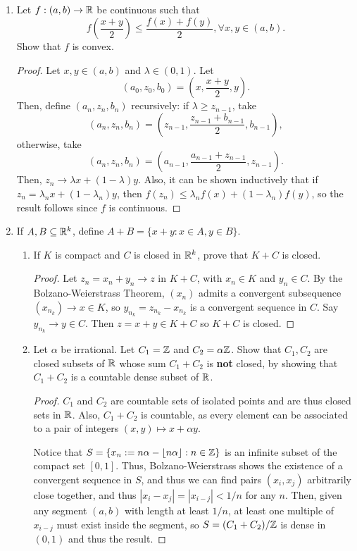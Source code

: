 \begin{enumerate}
\item %
Let $f: (a, b) \rightarrow \mathbb{R}$ be continuous such that
\[
    f\left(\frac{x+y}{2}\right) \le \frac{f(x) + f(y)}{2}, \forall x, y \in (a, b).
\]
Show that $f$ is convex.

\begin{proof}
    Let $x, y \in (a, b)$ and $\lambda \in (0, 1)$. Let
    \[
        (a_0, z_0, b_0) = (x, \frac{x+y}{2}, y).
    \]
    Then, define $(a_n, z_n, b_n)$ recursively: if $\lambda \ge z_{n-1}$, take 
    \[
        (a_n, z_n, b_n) = \left(z_{n-1}, \frac{z_{n-1} + b_{n-1}}{2}, b_{n-1}\right),
    \]
    otherwise, take 
    \[
        (a_n, z_n, b_n) = \left(a_{n-1}, \frac{a_{n-1} + z_{n-1}}{2}, z_{n-1}\right).
    \]
    Then, $z_n \to \lambda x + (1 - \lambda) y$. Also, it can be shown inductively that if $z_n = \lambda_n x + (1 - \lambda_n) y$, then $f(z_n) \le \lambda_n f(x) + (1 - \lambda_n) f(y)$, so the result follows since $f$ is continuous.
\end{proof}

\item %
If $A, B \subseteq \mathbb{R}^k$, define $A + B = \{x + y: x \in A, y \in B\}$.
\begin{enumerate}
\item If $K$ is compact and $C$ is closed in $\mathbb{R}^k$, prove that $K + C$ is closed.
\begin{proof}
    Let $z_n = x_n + y_n \to z$ in $K + C$, with $x_n \in K$ and $y_n \in C$. By the Bolzano-Weierstrass Theorem, $(x_n)$ admits a convergent subsequence $(x_{n_k}) \to x \in K$, so $y_{n_k} = z_{n_k} - x_{n_k}$ is a convergent sequence in $C$. Say $y_{n_k} \to y \in C$. Then $z = x + y \in K + C$ so $K + C$ is closed.
\end{proof}
\item Let $\alpha$ be irrational. Let $C_1 = \mathbb{Z}$ and $C_2 = \alpha\mathbb{Z}$. Show that $C_1, C_2$ are closed subsets of $\mathbb{R}$ whose sum $C_1 + C_2$ is \textbf{not} closed, by showing that $C_1 + C_2$ is a countable dense subset of $\mathbb{R}$.
\begin{proof}
    $C_1$ and $C_2$ are countable sets of isolated points and are thus closed sets in $\mathbb{R}$. Also, $C_1 + C_2$ is countable, as every element can be associated to a pair of integers $(x, y) \mapsto x + \alpha y$. 

    Notice that $S = \{ x_n := n\alpha - \lfloor{n \alpha\rfloor} : n \in \mathbb{Z}\}$ is an infinite subset of the compact set $[0, 1]$. Thus, Bolzano-Weierstrass shows the existence of a convergent sequence in $S$, and thus we can find pairs $(x_i, x_j)$ arbitrarily close together, and thus $|x_i - x_j| = |x_{i-j}| < 1/n$ for any $n$. Then, given any segment $(a, b)$ with length at least $1 / n$, at least one multiple of $x_{i-j}$ must exist inside the segment, so $S = (C_1 + C_2) / \mathbb{Z}$ is dense in $(0, 1)$ and thus the result.
\end{proof}
\end{enumerate}


\end{enumerate}
